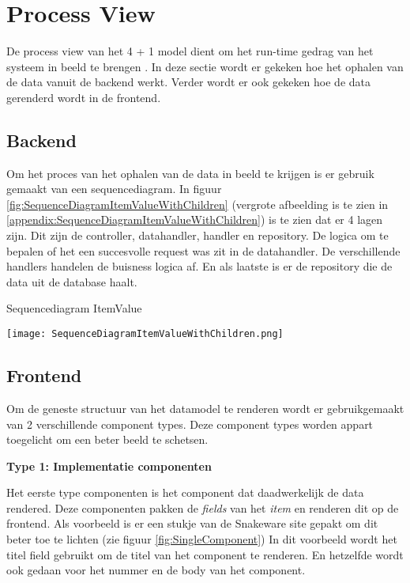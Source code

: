 \section{Process View}
De process view van het 4 + 1 model dient om het run-time gedrag van het systeem in beeld te brengen \parencite{4p1Model}.
In deze sectie wordt er gekeken hoe het ophalen van de data vanuit de backend werkt.
Verder wordt er ook gekeken hoe de data gerenderd wordt in de frontend.

\subsection{Backend}
Om het proces van het ophalen van de data in beeld te krijgen is er gebruik gemaakt van een sequencediagram.
In figuur \ref{fig:SequenceDiagramItemValueWithChildren} (vergrote afbeelding is te zien in \ref{appendix:SequenceDiagramItemValueWithChildren}) is te zien dat er 4 lagen zijn. 
Dit zijn de controller, datahandler, handler en repository.
De logica om te bepalen of het een succesvolle request was zit in de datahandler.
De verschillende handlers handelen de buisness logica af.
En als laatste is er de repository die de data uit de database haalt.

\whitespace
\begin{graphic}
    \captionsetup{type=figure}
    \caption{Sequencediagram ItemValue}
    \texttt{[image: SequenceDiagramItemValueWithChildren.png]}
    \label{fig:SequenceDiagramItemValueWithChildren}
\end{graphic}

\newpage
\subsection{Frontend}
\label{sec:FrontendProcessView}
Om de geneste structuur van het datamodel te renderen wordt er gebruikgemaakt van 2 verschillende component types.
Deze component types worden appart toegelicht om een beter beeld te schetsen.

\whitespace[2]
\textbf{Type 1: Implementatie componenten}

\whitespace
Het eerste type componenten is het component dat daadwerkelijk de data rendered.
Deze componenten pakken de \textit{fields} van het \textit{item} en renderen dit op de frontend.
Als voorbeeld is er een stukje van de Snakeware site gepakt om dit beter toe te lichten (zie figuur \ref{fig:SingleComponent})
In dit voorbeeld wordt het titel field  gebruikt om de titel van het component te renderen.
En hetzelfde wordt ook gedaan voor het nummer en de body van het component.

